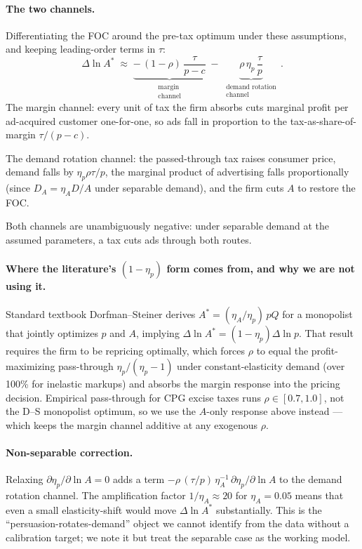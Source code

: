 \documentclass[11pt]{article}
\begin{document}
\paragraph{The two channels.} Differentiating the FOC
around the pre-tax optimum under these assumptions, and
keeping leading-order terms in $\tau$:
\begin{equation}\label{eq:two-channel}
    \boxed{\;
    \Delta \ln A^* \;\approx\;
    \underbrace{-\,(1-\rho)\,\frac{\tau}{p-c}}_{\substack{\text{margin}\\\text{channel}}}
    \;-\;
    \underbrace{\rho\,\eta_p\,\frac{\tau}{p}}_{\substack{\text{demand rotation}\\\text{channel}}}\,.
    \;}
\end{equation}
The margin channel: every unit of tax the firm absorbs
cuts marginal profit per ad-acquired customer
one-for-one, so ads fall in proportion to the
tax-as-share-of-margin $\tau / (p-c)$.

The demand rotation channel: the passed-through tax
raises consumer price, demand falls by $\eta_p \rho
\tau / p$, the marginal product of advertising falls
proportionally (since $D_A = \eta_A D / A$ under
separable demand), and the firm cuts $A$ to restore the
FOC.

Both channels are unambiguously negative: under
separable demand at the assumed parameters, a tax cuts
ads through both routes.

\paragraph{Where the literature's $(1-\eta_p)$ form
comes from, and why we are not using it.} Standard
textbook Dorfman--Steiner derives $A^* = (\eta_A /
\eta_p)\, pQ$ for a monopolist that jointly optimizes
$p$ and $A$, implying $\Delta \ln A^* = (1-\eta_p)\Delta
\ln p$. That result requires the firm to be repricing
optimally, which forces $\rho$ to equal the
profit-maximizing pass-through $\eta_p / (\eta_p - 1)$
under constant-elasticity demand (over 100\% for
inelastic markups) and absorbs the margin response
into the pricing decision. Empirical pass-through for
CPG excise taxes runs $\rho \in [0.7, 1.0]$, not the
D--S monopolist optimum, so we use the $A$-only
response above instead --- which keeps the margin
channel additive at any exogenous $\rho$.

\paragraph{Non-separable correction.} Relaxing
$\partial \eta_p / \partial \ln A = 0$ adds a term
$-\rho\,(\tau/p)\,\eta_A^{-1}\, \partial \eta_p /
\partial \ln A$ to the demand rotation channel. The
amplification factor $1/\eta_A \approx 20$ for $\eta_A
= 0.05$ means that even a small elasticity-shift would
move $\Delta \ln A^*$ substantially. This is the
``persuasion-rotates-demand'' object we cannot identify
from the data without a calibration target; we note it
but treat the separable case as the working model.
\end{document}
